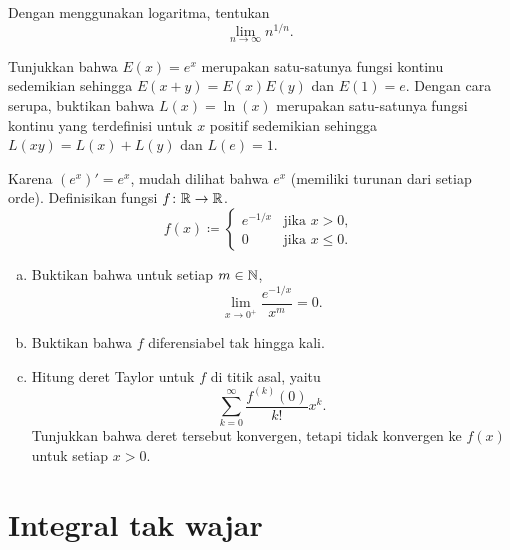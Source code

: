\begin{exercise}
Dengan menggunakan logaritma, tentukan
\begin{equation*}
\lim_{n\to\infty} n^{1/n} .
\end{equation*}
\end{exercise}

\begin{exercise}
Tunjukkan bahwa $E(x) = e^x$ merupakan satu-satunya fungsi kontinu sedemikian sehingga
$E(x+y) = E(x)E(y)$ dan $E(1) = e$.   Dengan cara serupa, buktikan bahwa $L(x) = \ln(x)$
merupakan satu-satunya fungsi kontinu
yang terdefinisi untuk $x$ positif sedemikian sehingga $L(xy) = L(x)+L(y)$
dan $L(e) = 1$.
\end{exercise}

\begin{exercise}\label{exercise:nonanalytic}
Karena $(e^x)' = e^x$, mudah dilihat bahwa $e^x$
(memiliki turunan dari setiap orde).  Definisikan fungsi $f \colon {\mathbb{R}} \to {\mathbb{R}}$.
\begin{equation*}
f(x) \coloneqq \begin{cases}
e^{-1/x} & \text{jika } x > 0, \\
0 & \text{jika } x \leq 0.
\end{cases}
\end{equation*}
\begin{enumerate}[a)]
\item
Buktikan bahwa untuk setiap $m \in {\mathbb{N}}$,
\begin{equation*}
\lim_{x \to 0^+} \frac{e^{-1/x}}{x^m} = 0 .
\end{equation*}
\item
Buktikan bahwa $f$ diferensiabel tak hingga kali.
\item
Hitung deret Taylor untuk $f$ di titik asal, yaitu
\begin{equation*}
\sum_{k=0}^\infty
\frac{f^{(k)}(0)}{k!}x^k .
\end{equation*}
Tunjukkan bahwa deret tersebut konvergen, tetapi tidak konvergen ke $f(x)$
untuk setiap $x > 0$.
\end{enumerate}
\end{exercise}


\sectionnewpage
\section{Integral tak wajar}
\label{sec:impropriemann}

